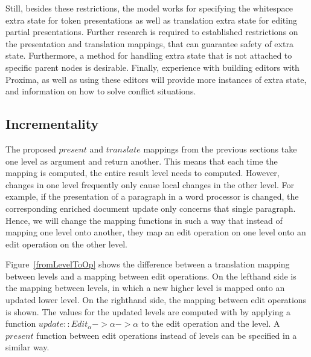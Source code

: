 Still, besides these restrictions, the model works for specifying the whitespace extra state for token presentations as well as translation extra state for editing partial presentations. Further research is required to established restrictions on the presentation and translation mappings, that can guarantee safety of extra state. Furthermore, a method for handling extra state that is not attached to specific parent nodes is desirable. Finally, experience with building editors with Proxima, as well as using these editors will provide more instances of extra state, and information on how to solve conflict situations.







%																
\subsection{Incrementality}

The proposed $present$ and $translate$ mappings from the previous sections take one level as argument and return another. This means that each time the mapping is computed, the entire result level needs to computed. However, changes in one level frequently only cause local changes in the other level. For example, if the presentation of a paragraph in a word processor is changed, the corresponding enriched document update only concerns that single paragraph. Hence, we will change the mapping functions in such a way that instead of mapping one level onto another, they map an edit operation on one level onto an edit operation on the other level. 

Figure~\ref{fromLevelToOp} shows the difference between a translation mapping between levels and a mapping between edit operations. On the lefthand side is the mapping between levels, in which a new higher level is mapped onto an updated lower level. On the righthand side, the mapping between edit operations is shown. The values for the updated levels are computed with by applying a function
 $update :: Edit_\alpha -> \alpha -> \alpha$ to the edit operation and the level. A $present$ function between edit operations instead of levels can be specified in a similar way.

